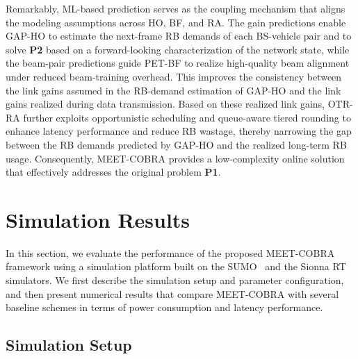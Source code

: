 \documentclass[conference, a4paper]{IEEEtran}
\theoremstyle{remark}
\begin{document}
Remarkably, ML-based prediction serves as the coupling mechanism that aligns the modeling assumptions across HO, BF, and RA. The gain predictions enable GAP-HO to estimate the next-frame RB demands of each BS-vehicle pair and to solve \textbf{P2} based on a forward-looking characterization of the network state, while the beam-pair predictions guide PET-BF to realize high-quality beam alignment under reduced beam-training overhead. This improves the consistency between the link gains assumed in the RB-demand estimation of GAP-HO and the link gains realized during data transmission. Based on these realized link gains, OTR-RA further exploits opportunistic scheduling and queue-aware tiered rounding to enhance latency performance and reduce RB wastage, thereby narrowing the gap between the RB demands predicted by GAP-HO and the realized long-term RB usage. Consequently, MEET-COBRA provides a low-complexity online solution that effectively addresses the original problem \textbf{P1}.


\section{Simulation Results}

In this section, we evaluate the performance of the proposed MEET-COBRA framework using a simulation platform built on the SUMO~\cite{behrisch2011sumo} and the Sionna RT~\cite{sionnaRT} simulators.
We first describe the simulation setup and parameter configuration, and then present numerical results that compare MEET-COBRA with several baseline schemes in terms of power consumption and latency performance.

\subsection{Simulation Setup}
\end{document}
